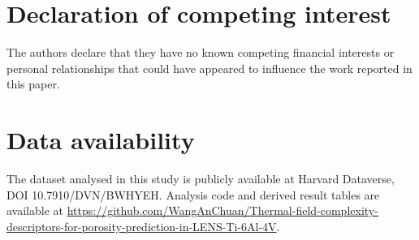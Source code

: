\documentclass[preprint,12pt]{elsarticle}
\begin{document}
\section*{Declaration of competing interest}

The authors declare that they have no known competing financial interests or personal relationships that could have appeared to influence the work reported in this paper.

\section*{Data availability}

The dataset analysed in this study is publicly available at Harvard Dataverse, DOI 10.7910/DVN/BWHYEH. Analysis code and derived result tables are available at \url{https://github.com/WangAnChuan/Thermal-field-complexity-descriptors-for-porosity-prediction-in-LENS-Ti-6Al-4V}.



\end{document}
